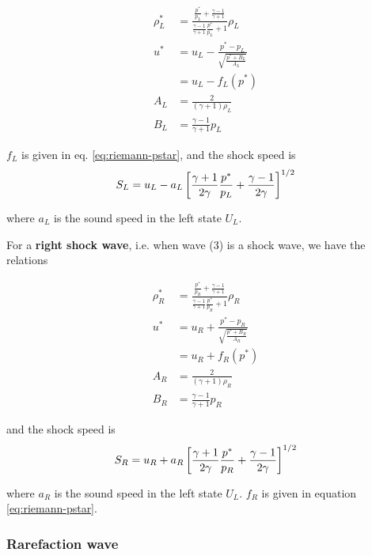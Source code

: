 \begin{align*}
	\rho^*_L &= 
		\frac{\frac{p^*}{p_L} + \frac{\gamma - 1}{\gamma+1}}{\frac{\gamma - 1}{\gamma+1} \frac{p^*}{p_L} + 1} \rho_L \\
	u^* &= 
		u_L - \frac{p^* - p_L}{\sqrt{\frac{p^* + B_L}{A_L}}}\\
		& = u_L - f_L(p^*) \\
	A_L &= 
		\frac{2}{(\gamma + 1) \rho_L}\\
	B_L &= 
		\frac{\gamma - 1}{\gamma + 1} p_L
\end{align*}

$f_{L}$ is given in eq. \ref{eq:riemann-pstar}, and the shock speed is
\begin{align*}
	S_L = u_L - a_L \left[\frac{\gamma + 1}{2 \gamma} \frac{p^*}{p_L} + \frac{\gamma - 1}{2\gamma} \right]^{1/2}
\end{align*}

where $a_L$ is the sound speed in the left state $U_L$.



For a \textbf{right shock wave}, i.e. when wave (3) is a shock wave, we have the relations


\begin{align*}
	\rho^*_R &= 
		\frac{\frac{p^*}{p_R} + \frac{\gamma - 1}{\gamma+1}}{\frac{\gamma - 1}{\gamma+1} \frac{p^*}{p_R} + 1} \rho_R \\
	u^* &= 
		u_R + \frac{p^* - p_R}{\sqrt{\frac{p^* + B_R}{A_R}}}\\
		& = u_R + f_R(p^*) \\
	A_R &= 
		\frac{2}{(\gamma + 1) \rho_R}\\
	B_R &= 
		\frac{\gamma - 1}{\gamma + 1} p_R
\end{align*}

and the shock speed is
\begin{align*}
	S_R = u_R + a_R \left[\frac{\gamma + 1}{2 \gamma} \frac{p^*}{p_R} + \frac{\gamma - 1}{2\gamma} \right]^{1/2}
\end{align*}

where $a_R$ is the sound speed in the left state $U_L$. $f_R$ is given in equation \ref{eq:riemann-pstar}.








\subsubsection{Rarefaction wave}


